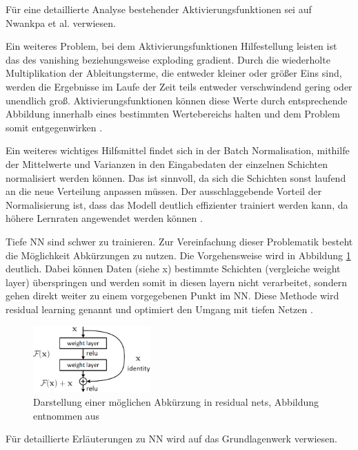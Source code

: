 \documentclass[12pt,a4paper]{article}
\begin{document}
Für eine detaillierte Analyse bestehender Aktivierungsfunktionen sei auf Nwankpa et al. \cite{Nwankpa2018} verwiesen.

Ein weiteres Problem, bei dem Aktivierungsfunktionen Hilfestellung leisten ist das des vanishing beziehungsweise exploding gradient. Durch die wiederholte Multiplikation der Ableitungsterme, die entweder kleiner oder größer Eins sind, werden die Ergebnisse im Laufe der Zeit teils entweder verschwindend gering oder unendlich groß. Aktivierungsfunktionen können diese Werte durch entsprechende Abbildung innerhalb eines bestimmten Wertebereichs halten und dem Problem somit entgegenwirken \cite{Nwankpa2018}.

Ein weiteres wichtiges Hilfsmittel findet sich in der Batch Normalisation, mithilfe der Mittelwerte und Varianzen in den Eingabedaten der einzelnen Schichten normalisiert werden können. Das ist sinnvoll, da sich die Schichten sonst laufend an die neue Verteilung anpassen müssen. Der ausschlaggebende Vorteil der Normalisierung ist, dass das Modell deutlich effizienter trainiert werden kann, da höhere Lernraten angewendet werden können  \cite{Ioffe2015}.

Tiefe NN sind schwer zu trainieren. Zur Vereinfachung dieser Problematik besteht die Möglichkeit Abkürzungen zu nutzen. Die Vorgehensweise wird in Abbildung \ref{fig:res_skip} deutlich. Dabei können Daten (siehe \glqq{}x\grqq) bestimmte Schichten (vergleiche \glqq{}weight layer\grqq) überspringen und werden somit in diesen layern nicht verarbeitet, sondern gehen direkt weiter zu einem vorgegebenen Punkt im NN. Diese Methode wird \glqq{}residual learning\grqq{} genannt und optimiert den Umgang mit tiefen Netzen \cite{He2016}.

\begin{figure}
\centering
\includegraphics[width=0.4\textwidth]{pics/res_skip_connection.png}	
\caption{Darstellung einer möglichen Abkürzung in residual nets, Abbildung entnommen aus \cite{He2016}}
\label{fig:res_skip}
\end{figure}

Für detaillierte Erläuterungen zu NN wird auf das Grundlagenwerk \cite{Goodfellow2015} verwiesen.
\end{document}
